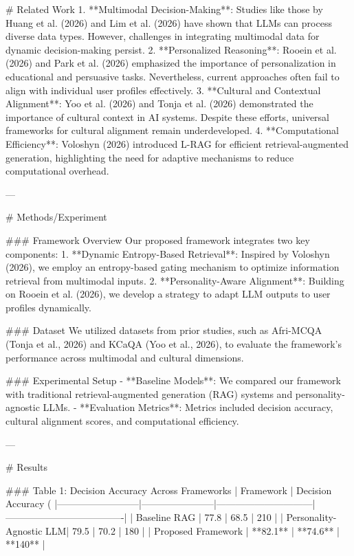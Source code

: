 # Related Work  
1. **Multimodal Decision-Making**: Studies like those by Huang et al. (2026) and Lim et al. (2026) have shown that LLMs can process diverse data types. However, challenges in integrating multimodal data for dynamic decision-making persist.  
2. **Personalized Reasoning**: Rooein et al. (2026) and Park et al. (2026) emphasized the importance of personalization in educational and persuasive tasks. Nevertheless, current approaches often fail to align with individual user profiles effectively.  
3. **Cultural and Contextual Alignment**: Yoo et al. (2026) and Tonja et al. (2026) demonstrated the importance of cultural context in AI systems. Despite these efforts, universal frameworks for cultural alignment remain underdeveloped.  
4. **Computational Efficiency**: Voloshyn (2026) introduced L-RAG for efficient retrieval-augmented generation, highlighting the need for adaptive mechanisms to reduce computational overhead.  

---

# Methods/Experiment  

### Framework Overview  
Our proposed framework integrates two key components:  
1. **Dynamic Entropy-Based Retrieval**: Inspired by Voloshyn (2026), we employ an entropy-based gating mechanism to optimize information retrieval from multimodal inputs.  
2. **Personality-Aware Alignment**: Building on Rooein et al. (2026), we develop a strategy to adapt LLM outputs to user profiles dynamically.  

### Dataset  
We utilized datasets from prior studies, such as Afri-MCQA (Tonja et al., 2026) and KCaQA (Yoo et al., 2026), to evaluate the framework's performance across multimodal and cultural dimensions.  

### Experimental Setup  
- **Baseline Models**: We compared our framework with traditional retrieval-augmented generation (RAG) systems and personality-agnostic LLMs.  
- **Evaluation Metrics**: Metrics included decision accuracy, cultural alignment scores, and computational efficiency.  

---

# Results  

### Table 1: Decision Accuracy Across Frameworks  
| Framework               | Decision Accuracy (%
|--------------------------|-----------------------|------------------------------|-------------------------------------|  
| Baseline RAG            | 77.8                 | 68.5                         | 210                                 |  
| Personality-Agnostic LLM| 79.5                 | 70.2                         | 180                                 |  
| Proposed Framework      | **82.1**             | **74.6**                     | **140**                             |  

